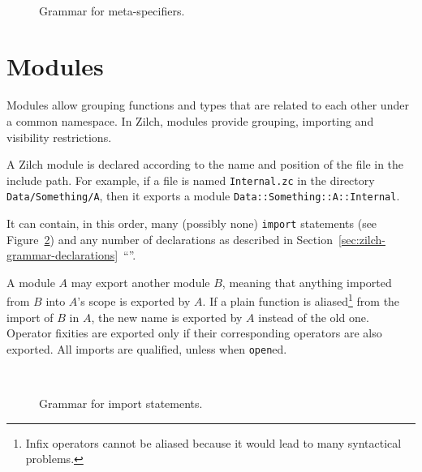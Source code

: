 \begin{figure}[H]
	\centering

	\\

	\caption{Grammar for meta-specifiers.}
	\label{fig:zilch-grammar-declarations-meta-grammar}
\end{figure}

\section{Modules}\label{sec:zilch-grammar-modules}

Modules allow grouping functions and types that are related to each other under a common namespace.
In Zilch, modules provide grouping, importing and visibility restrictions.

A Zilch module is declared according to the name and position of the file in the include path.
For example, if a file is named \verb|Internal.zc| in the directory \verb|Data/Something/A|, then it exports a module \verb|Data::Something::A::Internal|.

It can contain, in this order, many (possibly none) \texttt{import} statements (see Figure~\ref{fig:zilch-grammar-modules-importgrammar}) and any number of declarations as described in Section~\ref{sec:zilch-grammar-declarations}~``''.

A module $A$ may export another module $B$, meaning that anything imported from $B$ into $A$'s scope is exported by $A$.
If a plain function is aliased\footnote{Infix operators cannot be aliased because it would lead to many syntactical problems.} from the import of $B$ in $A$, the new name is exported by $A$ instead of the old one.
Operator fixities are exported only if their corresponding operators are also exported.
All imports are qualified, unless when \verb|open|ed.

\begin{figure}[H]
	\centering

	\\

	\caption{Grammar for import statements.}
	\label{fig:zilch-grammar-modules-importgrammar}
\end{figure}

